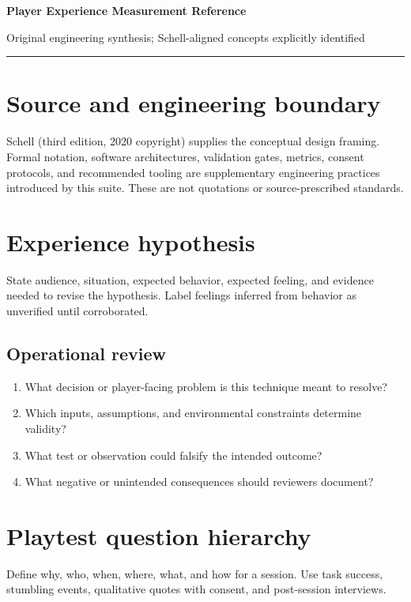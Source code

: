 \documentclass[11pt]{article}
\begin{document}
{\huge\bfseries\color{suiteblue} Player Experience Measurement Reference}\par
\vspace{0.15in}
{\normalsize\color{suitegray} Original engineering synthesis; Schell-aligned concepts explicitly identified}\par
\vspace{0.15in}\hrule\vspace{0.15in}

\section{Source and engineering boundary}
Schell (third edition, 2020 copyright) supplies the conceptual design framing. Formal notation, software architectures, validation gates, metrics, consent protocols, and recommended tooling are supplementary engineering practices introduced by this suite. These are not quotations or source-prescribed standards.


\section{Experience hypothesis}
State audience, situation, expected behavior, expected feeling, and evidence needed to revise the hypothesis. Label feelings inferred from behavior as unverified until corroborated.


\subsection{Operational review}
\begin{enumerate}
\item What decision or player-facing problem is this technique meant to resolve?
\item Which inputs, assumptions, and environmental constraints determine validity?
\item What test or observation could falsify the intended outcome?
\item What negative or unintended consequences should reviewers document?
\end{enumerate}

\section{Playtest question hierarchy}
Define why, who, when, where, what, and how for a session. Use task success, stumbling events, qualitative quotes with consent, and post-session interviews.
\end{document}
